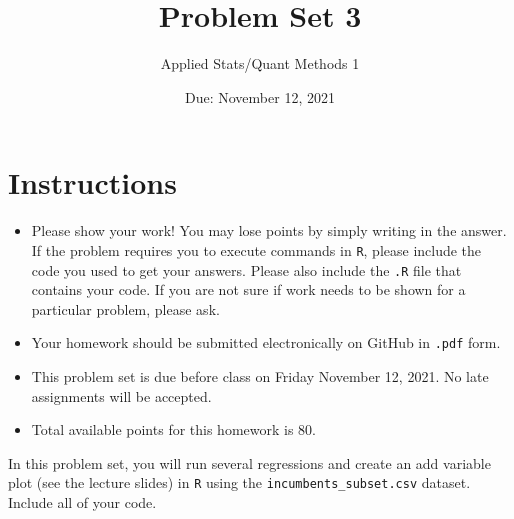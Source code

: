 \documentclass[12pt,letterpaper]{article}
\title{Problem Set 3}
\date{Due: November 12, 2021}
\author{Applied Stats/Quant Methods 1}
\begin{document}
	\maketitle
	\section*{Instructions}
	\begin{itemize}
		\item Please show your work! You may lose points by simply writing in the answer. If the problem requires you to execute commands in \texttt{R}, please include the code you used to get your answers. Please also include the \texttt{.R} file that contains your code. If you are not sure if work needs to be shown for a particular problem, please ask.
		\item Your homework should be submitted electronically on GitHub in \texttt{.pdf} form.
		\item This problem set is due before class on Friday November 12, 2021. No late assignments will be accepted.
		\item Total available points for this homework is 80.
	\end{itemize}

	
		\vspace{.25cm}
	
\noindent In this problem set, you will run several regressions and create an add variable plot (see the lecture slides) in \texttt{R} using the \texttt{incumbents\_subset.csv} dataset. Include all of your code.

	\vspace{.5cm}
\end{document}
